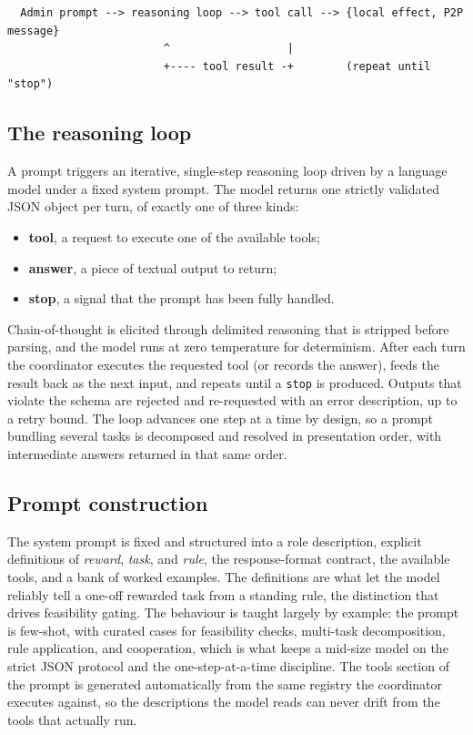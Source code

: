 \documentclass[a4paper,11pt]{article}
\begin{document}
\begin{center}
\begin{verbatim}
  Admin prompt --> reasoning loop --> tool call --> {local effect, P2P message}
                        ^                  |
                        +---- tool result -+        (repeat until "stop")
\end{verbatim}
\end{center}

\subsection{The reasoning loop}

A prompt triggers an iterative, single-step reasoning loop driven by a language
model under a fixed system prompt. The model returns one strictly validated JSON
object per turn, of exactly one of three kinds:

\begin{itemize}
  \item \textbf{tool}, a request to execute one of the available tools;
  \item \textbf{answer}, a piece of textual output to return;
  \item \textbf{stop}, a signal that the prompt has been fully handled.
\end{itemize}

Chain-of-thought is elicited through delimited reasoning that is stripped before
parsing, and the model runs at zero temperature for determinism. After each turn the
coordinator executes the requested tool (or records the answer), feeds the result
back as the next input, and repeats until a \texttt{stop} is produced. Outputs that
violate the schema are rejected and re-requested with an error description, up to a
retry bound. The loop advances one step at a time by design, so a prompt bundling
several tasks is decomposed and resolved in presentation order, with intermediate
answers returned in that same order.

\subsection{Prompt construction}

The system prompt is fixed and structured into a role description, explicit
definitions of \emph{reward}, \emph{task}, and \emph{rule}, the response-format
contract, the available tools, and a bank of worked examples. The definitions are
what let the model reliably tell a one-off rewarded task from a standing rule, the
distinction that drives feasibility gating. The behaviour is taught largely by
example: the prompt is few-shot, with curated cases for feasibility checks,
multi-task decomposition, rule application, and cooperation, which is what keeps a
mid-size model on the strict JSON protocol and the one-step-at-a-time discipline.
The tools section of the prompt is generated automatically from the same registry
the coordinator executes against, so the descriptions the model reads can never
drift from the tools that actually run.
\end{document}

